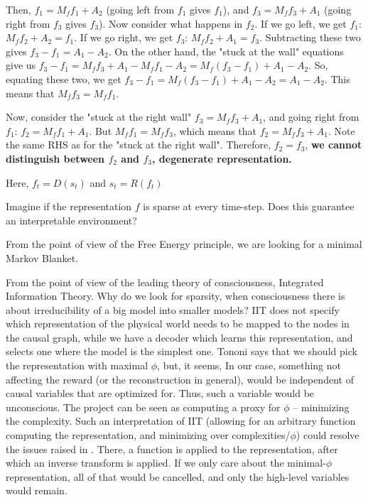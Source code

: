 \documentclass[a4paper,11pt,oneside]{report}
\begin{document}
Then, $f_1=M_ff_1+A_2$ (going left from $f_1$ gives $f_1$), and $f_3=M_ff_3+A_1$ (going right from $f_3$ gives $f_3$). Now consider what happens in $f_2$. If we go left, we get $f_1$: $M_ff_2+A_2=f_1$. If we go right, we get $f_3$: $M_ff_2+A_1=f_3$. Subtracting these two gives $f_3-f_1=A_1-A_2$. On the other hand, the "stuck at the wall" equations give us $f_3-f_1=M_ff_3+A_1-M_ff_1-A_2=M_f(f_3-f_1)+A_1-A_2$. So, equating these two, we get
$f_3-f_1=M_f(f_3-f_1)+A_1-A_2=A_1-A_2$. This means that $M_ff_3=M_ff_1$.

Now, consider the "stuck at the right wall" $f_3=M_ff_3+A_1$, and going right from $f_1$: $f_2=M_ff_1+A_1$. But $M_ff_1=M_ff_3$, which means that $f_2=M_ff_3+A_1$. Note the same RHS as for the "stuck at the right wall". Therefore, $f_2=f_3$, {\bf we cannot distinguish between $f_2$ and $f_3$, degenerate representation.}



Here, $f_t=D(s_t)$ and $s_t=R(f_t)$

Imagine if the representation $f$ is sparse at every time-step. Does this guarantee an interpretable environment?

From the point of view of the Free Energy principle, we are looking for a minimal Markov Blanket.

From the point of view of the leading theory of consciousness, Integrated Information Theory. Why do we look for sparsity, when consciousness there is about irreducibility of a big model into smaller models? IIT does not specify which representation of the physical world needs to be mapped to the nodes in the causal graph, while we have a decoder which learns this representation, and selects one where the model is the simplest one. Tononi says that we should pick the representation with maximal $\phi$, but, it seems, In our case, something not affecting the reward (or the reconstruction in general), would be independent of causal variables that are optimized for. Thus, such a variable would be unconscious. The project can be seen as computing a proxy for $\phi$ -- minimizing the complexity. Such an interpretation of IIT (allowing for an arbitrary function computing the representation, and minimizing over complexities/$\phi$) could resolve the issues raised in \cite{doerig2019unfolding}. There, a function is applied to the representation, after which an inverse transform is applied. If we only care about the minimal-$\phi$ representation, all of that would be cancelled, and only the high-level variables would remain.
\end{document}
